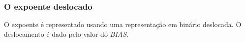 \documentclass[main.tex]{subfiles}
\begin{document}
% 

\subsubsection{O expoente deslocado}
O expoente é representado usando uma representação em binário deslocada. O deslocamento é dado pelo valor do \emph{BIAS}.
\end{document}
